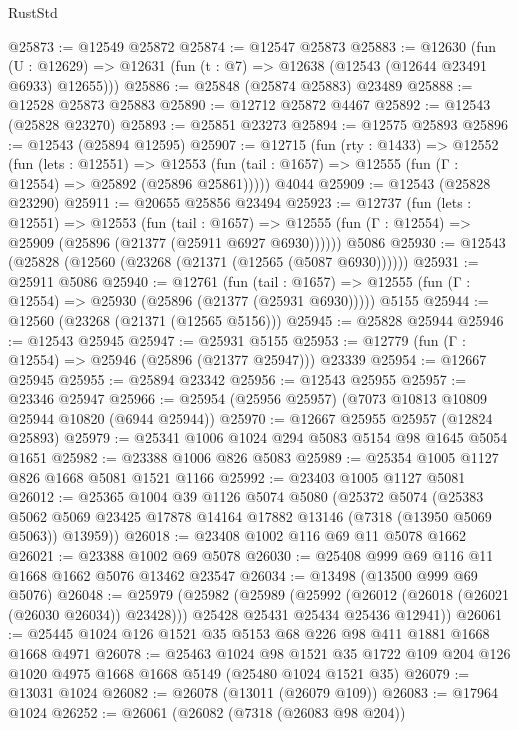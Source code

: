 \begin{lexlean}{RustStd}
\begin{coremodule}
@25873 := @12549 @25872
@25874 := @12547 @25873
@25883 := @12630
    (fun (U : @12629) => @12631 (fun (t : @7) => @12638 (@12543 (@12644 @23491 @6933) @12655)))
@25886 := @25848 (@25874 @25883) @23489
@25888 := @12528 @25873 @25883
@25890 := @12712 @25872 @4467
@25892 := @12543 (@25828 @23270)
@25893 := @25851 @23273
@25894 := @12575 @25893
@25896 := @12543 (@25894 @12595)
@25907 := @12715
    (fun (rty : @1433) =>
    @12552
      (fun (lets : @12551) =>
      @12553 (fun (tail : @1657) => @12555 (fun (Γ : @12554) => @25892 (@25896 @25861)))))
    @4044
@25909 := @12543 (@25828 @23290)
@25911 := @20655 @25856 @23494
@25923 := @12737
    (fun (lets : @12551) =>
    @12553
      (fun (tail : @1657) =>
      @12555 (fun (Γ : @12554) => @25909 (@25896 (@21377 (@25911 @6927 @6930))))))
    @5086
@25930 := @12543 (@25828 (@12560 (@23268 (@21371 (@12565 (@5087 @6930))))))
@25931 := @25911 @5086
@25940 := @12761
    (fun (tail : @1657) => @12555 (fun (Γ : @12554) => @25930 (@25896 (@21377 (@25931 @6930)))))
    @5155
@25944 := @12560 (@23268 (@21371 (@12565 @5156)))
@25945 := @25828 @25944
@25946 := @12543 @25945
@25947 := @25931 @5155
@25953 := @12779 (fun (Γ : @12554) => @25946 (@25896 (@21377 @25947))) @23339
@25954 := @12667 @25945
@25955 := @25894 @23342
@25956 := @12543 @25955
@25957 := @23346 @25947
@25966 := @25954 (@25956 @25957) (@7073 @10813 @10809 @25944 @10820 (@6944 @25944))
@25970 := @12667 @25955 @25957 (@12824 @25893)
@25979 := @25341 @1006 @1024 @294 @5083 @5154 @98 @1645 @5054 @1651
@25982 := @23388 @1006 @826 @5083
@25989 := @25354 @1005 @1127 @826 @1668 @5081 @1521 @1166
@25992 := @23403 @1005 @1127 @5081
@26012 := @25365
    @1004
    @39
    @1126
    @5074
    @5080
    (@25372
      @5074
      (@25383 @5062 @5069 @23425 @17878 @14164 @17882 @13146 (@7318 (@13950 @5069 @5063)) @13959))
@26018 := @23408 @1002 @116 @69 @11 @5078 @1662
@26021 := @23388 @1002 @69 @5078
@26030 := @25408 @999 @69 @116 @11 @1668 @1662 @5076 @13462 @23547
@26034 := @13498 (@13500 @999 @69 @5076)
@26048 := @25979
    (@25982
      (@25989
        (@25992 (@26012 (@26018 (@26021 (@26030 @26034)) @23428)))
        @25428
        @25431
        @25434
        @25436
        @12941))
@26061 := @25445 @1024 @126 @1521 @35 @5153 @68 @226 @98 @411 @1881 @1668 @1668 @4971
@26078 := @25463
    @1024
    @98
    @1521
    @35
    @1722
    @109
    @204
    @126
    @1020
    @4975
    @1668
    @1668
    @5149
    (@25480 @1024 @1521 @35)
@26079 := @13031 @1024
@26082 := @26078 (@13011 (@26079 @109))
@26083 := @17964 @1024
@26252 := @26061
    (@26082
      (@7318 (@26083 @98 @204))

\end{coremodule}
\end{lexlean}
